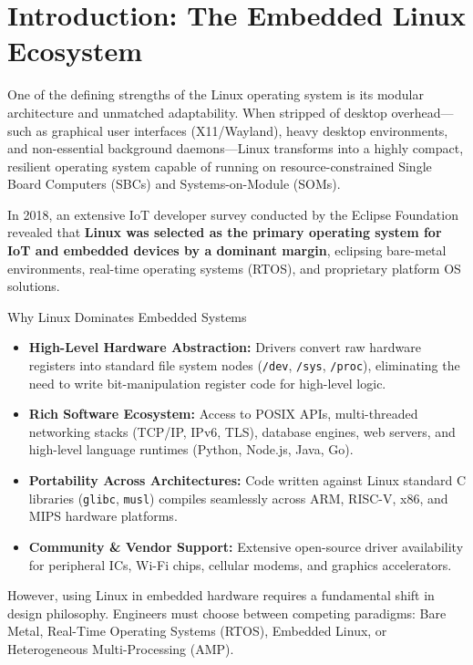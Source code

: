 \section{Introduction: The Embedded Linux Ecosystem}

One of the defining strengths of the Linux operating system is its modular architecture and unmatched adaptability. When stripped of desktop overhead—such as graphical user interfaces (X11/Wayland), heavy desktop environments, and non-essential background daemons—Linux transforms into a highly compact, resilient operating system capable of running on resource-constrained Single Board Computers (SBCs) and Systems-on-Module (SOMs).

In 2018, an extensive IoT developer survey conducted by the Eclipse Foundation revealed that \textbf{Linux was selected as the primary operating system for IoT and embedded devices by a dominant margin}, eclipsing bare-metal environments, real-time operating systems (RTOS), and proprietary platform OS solutions. 

\begin{conceptbox}{Why Linux Dominates Embedded Systems}
\begin{itemize}[leftmargin=*]
    \item \textbf{High-Level Hardware Abstraction:} Drivers convert raw hardware registers into standard file system nodes (\texttt{/dev}, \texttt{/sys}, \texttt{/proc}), eliminating the need to write bit-manipulation register code for high-level logic.
    \item \textbf{Rich Software Ecosystem:} Access to POSIX APIs, multi-threaded networking stacks (TCP/IP, IPv6, TLS), database engines, web servers, and high-level language runtimes (Python, Node.js, Java, Go).
    \item \textbf{Portability Across Architectures:} Code written against Linux standard C libraries (\texttt{glibc}, \texttt{musl}) compiles seamlessly across ARM, RISC-V, x86, and MIPS hardware platforms.
    \item \textbf{Community \& Vendor Support:} Extensive open-source driver availability for peripheral ICs, Wi-Fi chips, cellular modems, and graphics accelerators.
\end{itemize}
\end{conceptbox}

However, using Linux in embedded hardware requires a fundamental shift in design philosophy. Engineers must choose between competing paradigms: Bare Metal, Real-Time Operating Systems (RTOS), Embedded Linux, or Heterogeneous Multi-Processing (AMP).
